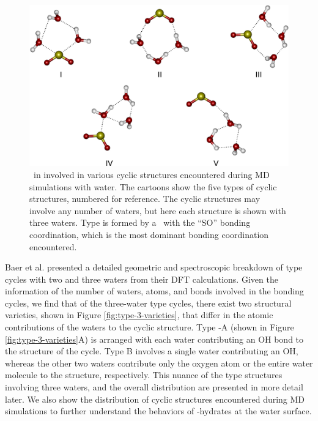 \begin{figure}[h!]
	\begin{center}
		\includegraphics[scale=1.0]{images/cycles/cycle-types-small.png}
		\caption{\suldiox~in involved in various cyclic structures encountered during MD simulations with water. The cartoons show the five types of cyclic structures, numbered for reference. The cyclic structures may involve any number of waters, but here each structure is shown with three waters. Type  is formed by a \suldiox~with the ``SO'' bonding coordination, which is the most dominant bonding coordination encountered.}
		\label{fig:cyclic-structures}
	\end{center}
\end{figure}

Baer et al. presented a detailed geometric and spectroscopic breakdown of type  cycles with two and three waters from their DFT calculations.\cite{Baer2010} Given the information of the number of waters, atoms, and bonds involved in the bonding cycles, we find that of the three-water type  cycles, there exist two structural varieties, shown in Figure \ref{fig:type-3-varieties}, that differ in the atomic contributions of the waters to the cyclic structure. Type -A (shown in Figure \ref{fig:type-3-varieties}A) is arranged with each water contributing an OH bond to the structure of the cycle. Type B involves a single water contributing an OH, whereas the other two waters contribute only the oxygen atom or the entire water molecule to the structure, respectively. This nuance of the type  structures involving three waters, and the overall distribution are presented in more detail later. We also show the distribution of cyclic structures encountered during MD simulations to further understand the behaviors of \suldiox-hydrates at the water surface.

